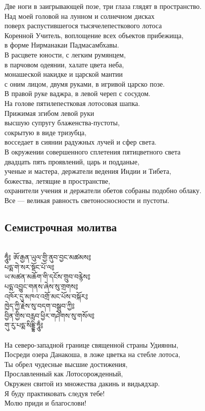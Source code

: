 Две ноги в заигрывающей позе, три глаза глядят в пространство.\\
Над моей головой на лунном и солнечном дисках \\
поверх распустившегося тысячелепесткового лотоса\\
Коренной Учитель, воплощение всех объектов прибежища,\\
в форме Нирманакаи Падмасамбхавы.\\
В расцвете юности, с легким румянцем,\\
в парчовом одеянии, халате цвета неба, \\
монашеской накидке и царской мантии\\
с оним лицом, двумя руками, в игривой царско позе.\\
В правой руке ваджра, в левой череп с сосудом.\\
На голове пятилепестковая лотосовая шапка.\\
Прижимая згибом левой руки \\
высшую супругу блаженства-пустоты,\\
сокрытую в виде тризубца,\\
восседает в сиянии радужных лучей и сфер света.\\
В окружении совершенного сплетения пятицветного света\\
двадцать пять проявлений, царь и подданые,\\
ученые и мастера, держатели ведения Индии и Тибета, \\
божества, летящие в пространстве, \\
охранители учения и держатели обетов собраны подобно облаку.\\
Все — великая равность светоносносности и пустоты.
\newpage
\subsection{Семистрочная молитва}
\\
\ti
ཧཱུྂ༔ ཨོ་རྒྱན་ཡུལ་གྱི་ནུབ་བྱང་མཚམས༔\\
པདྨ་གེ་སར་སྡོང་པོ་ལ༔\\
ཡ་མཚན་མཆོག་གི་དངོས་གྲུབ་བརྙེས༔\\
པདྨ་འབྱུང་གནས་ཞེས་སུ་གྲགས༔\\
འཁོར་དུ་མཁའ་འགྲོ་མང་པོས་བསྐོར༔\\
ཁྱེད་ཀྱི་རྗེས་སུ་བདག་བསྒྲུབ་ཀྱི༔\\
བྱིན་གྱིས་བརླབ་ཕྱིར་གཤེགས་སུ་གསོལ༔\\
གུ་རུ་པདྨ་སིདྡྷི་ཧཱུྂ༔\\
\\
\ru
На северо-западной границе священной страны Удиянны,\\
Посреди озера Данакоша, в ложе цветка на стебле лотоса,\\
Ты обрел чудесные высшие достижения,\\
Прославленный как Лотосорожденный,\\
Окружен свитой из множества дакинь и видьядхар.\\
Я буду практиковать следуя тебе!\\
Молю приди и благослови!
\newpage
